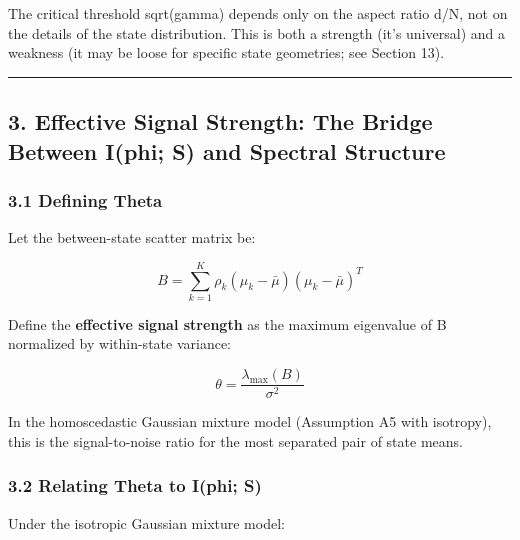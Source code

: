 \documentclass[
  12pt,
]{article}
\begin{document}
The critical threshold sqrt(gamma) depends only on the aspect ratio d/N,
not on the details of the state distribution. This is both a strength
(it's universal) and a weakness (it may be loose for specific state
geometries; see Section 13).

\begin{center}\rule{0.5\linewidth}{0.5pt}\end{center}

\subsection{3. Effective Signal Strength: The Bridge Between I(phi; S)
and Spectral
Structure}\label{effective-signal-strength-the-bridge-between-iphi-s-and-spectral-structure}

\subsubsection{3.1 Defining Theta}\label{defining-theta}

Let the between-state scatter matrix be:

\[B = \sum_{k=1}^K \rho_k (\mu_k - \bar{\mu})(\mu_k - \bar{\mu})^T\]

Define the \textbf{effective signal strength} as the maximum eigenvalue
of B normalized by within-state variance:

\[\theta = \frac{\lambda_{\max}(B)}{\sigma^2}\]

In the homoscedastic Gaussian mixture model (Assumption A5 with
isotropy), this is the signal-to-noise ratio for the most separated pair
of state means.

\subsubsection{3.2 Relating Theta to I(phi;
S)}\label{relating-theta-to-iphi-s}

Under the isotropic Gaussian mixture model:
\end{document}
